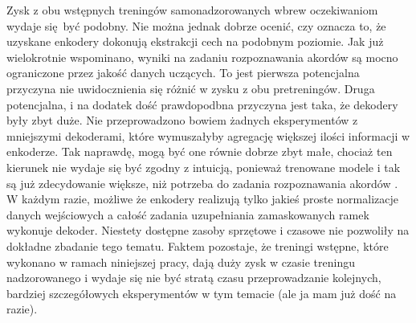 Zysk z obu wstępnych treningów samonadzorowanych wbrew oczekiwaniom wydaje się być podobny. Nie można jednak dobrze ocenić, czy oznacza to, że uzyskane enkodery dokonują ekstrakcji cech na podobnym poziomie. Jak już wielokrotnie wspominano, wyniki na zadaniu rozpoznawania akordów są mocno ograniczone przez jakość danych uczących. To jest pierwsza potencjalna przyczyna nie uwidocznienia się różnić w zysku z obu pretreningów. Druga potencjalna, i na dodatek dość prawdopodbna przyczyna jest taka, że dekodery były zbyt duże. Nie przeprowadzono bowiem żadnych eksperymentów z mniejszymi dekoderami, które wymuszałyby agregację większej ilości informacji w enkoderze. Tak naprawdę, mogą być one równie dobrze zbyt małe, chociaż ten kierunek nie wydaje się być zgodny z intuicją, ponieważ trenowane modele i tak są już zdecydowanie większe, niż potrzeba do zadania rozpoznawania akordów \cite{ohanlon_fifthnet_2021}. W każdym razie, możliwe że enkodery realizują tylko jakieś proste normalizacje danych wejściowych a całość zadania uzupełniania zamaskowanych ramek wykonuje dekoder. Niestety dostępne zasoby sprzętowe i czasowe nie pozwoliły na dokładne zbadanie tego tematu. Faktem pozostaje, że treningi wstępne, które wykonano w ramach niniejszej pracy, dają duży zysk w czasie treningu nadzorowanego i wydaje się nie być stratą czasu przeprowadzanie kolejnych, bardziej szczegółowych eksperymentów w tym temacie (ale ja mam już dość na razie).

